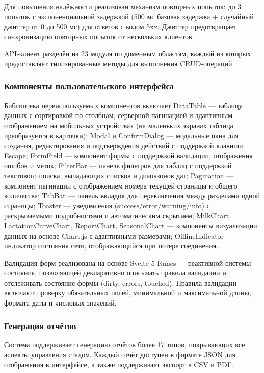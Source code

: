 Для повышения надёжности реализован механизм повторных попыток: до 3 попыток с экспоненциальной задержкой (500 мс базовая задержка + случайный джиттер от 0 до 500 мс) для ответов с кодом 5xx. Джиттер предотвращает синхронизацию повторных попыток от нескольких клиентов.

API-клиент разделён на 23 модуля по доменным областям, каждый из которых предоставляет типизированные методы для выполнения CRUD-операций.

\subsubsection{Компоненты пользовательского интерфейса}

Библиотека переиспользуемых компонентов включает DataTable --- таблицу данных с сортировкой по столбцам, серверной пагинацией и адаптивным отображением на мобильных устройствах (на маленьких экранах таблица преобразуется в карточки); Modal и ConfirmDialog --- модальные окна для создания, редактирования и подтверждения действий с поддержкой клавиши Escape; FormField --- компонент формы с поддержкой валидации, отображения ошибок и меток; FilterBar --- панель фильтров для таблиц с поддержкой текстового поиска, выпадающих списков и диапазонов дат; Pagination --- компонент пагинации с отображением номера текущей страницы и общего количества; TabBar --- панель вкладок для переключения между разделами одной страницы; Toaster --- уведомления (success/error/warning/info) с раскрываемыми подробностями и автоматическим скрытием; MilkChart, LactationCurveChart, ReportChart, SeasonalChart --- компоненты визуализации данных на основе Chart.js с адаптивными размерами; OfflineIndicator --- индикатор состояния сети, отображающийся при потере соединения.

Валидация форм реализована на основе Svelte 5 Runes --- реактивной системы состояния, позволяющей декларативно описывать правила валидации и отслеживать состояние формы (dirty, errors, touched). Правила валидации включают проверку обязательных полей, минимальной и максимальной длины, формата даты и числовых значений.

\subsubsection{Генерация отчётов}

Система поддерживает генерацию отчётов более 17 типов, покрывающих все аспекты управления стадом. Каждый отчёт доступен в формате JSON для отображения в интерфейсе, а также поддерживает экспорт в CSV и PDF.

